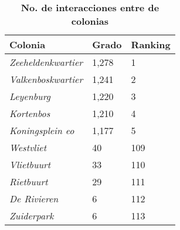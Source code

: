 \def\arraystretch{1.5} %
\begin{table}[H]
\centering
\caption{\textbf{No. de interacciones entre de colonias}}
\footnotesize
\centering
\begin{tabular}{p{3cm} p{1.5cm} p{1.5cm}}
\textbf{Colonia} &  \textbf{Grado} & \textbf{Ranking}\\
\hline
\hline 
\textit{Zeeheldenkwartier} & 1,278 & 1\\
\textit{Valkenboskwartier} & 1,241 & 2\\
\textit{Leyenburg} & 1,220 & 3\\
\textit{Kortenbos} & 1,210 & 4\\
\textit{Koningsplein eo} & 1,177 & 5\\
\textit{Westvliet} & 40 &  109\\
\textit{Vlietbuurt} & 33 & 110\\
\textit{Rietbuurt} & 29 & 111 \\
\textit{De Rivieren} & 6 & 112\\
\textit{Zuiderpark} & 6 & 113
\end{tabular}

\vspace{2mm}
\end{table}



